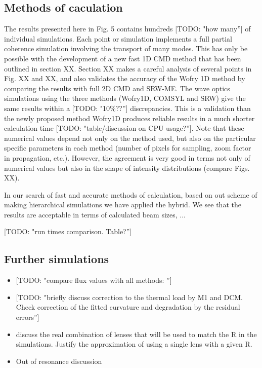 \documentclass{iucr}              %
\newcommand{\todo}[1]{{\color{red}[TODO: "#1'']}}
\newcommand{\inred}[1]{{\color{red}#1}}
\begin{document}
\subsection{Methods of caculation}

The results presented here in Fig. 5 contains hundreds \todo{how many} of individual simulations. Each point or simulation implements a full partial coherence simulation involving the transport of many modes. This has only be possible with the development of a new fast 1D CMD method that has been outlined in section XX. Section XX makes a careful analysis of several points in Fig. XX and XX, and also validates the accuracy of the Wofry 1D method by comparing the results with full 2D CMD and SRW-ME. 
The wave optics simulations using the three methods (Wofry1D, COMSYL and SRW) give the same results within a \todo{10\%??} discrepancies. This is a validation than the newly proposed method Wofry1D produces reliable results in a much shorter calculation time \todo{table/discussion on CPU usage?}. Note that these numerical values depend not only on the method used, but also on the particular specific parameters in each method (number of pixels for sampling, zoom factor in propagation, etc.). However, the agreement is very good in terms not only of numerical values but also in the shape of intensity distributions (compare Figs. XX).
 
\inred{In our search of fast and accurate methods of calculation, based on out scheme of making hierarchical simulations \cite{hierarchical} we have applied the hybrid. We see that the results are acceptable in terms of calculated beam sizes, ... }

\todo{run times comparison. Table?}



\subsection{Further simulations}

\begin{itemize}
    \item{\todo{compare flux values with all methods: }}
    
    \item \todo{briefly discuss correction to the thermal load by M1 and DCM. Check correction of the fitted curvature and degradation by the residual errors}
    
    \item discuss the real combination of lenses that will be used to match the R in the simulations. Justify the approximation of using a single lens with a given R. 
    
    \item Out of resonance discussion
    
\end{itemize}
\end{document}
